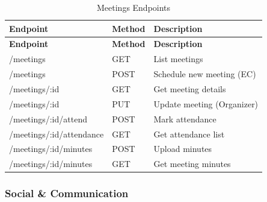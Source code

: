 \documentclass[12pt,a4paper]{article}
\begin{document}
\begin{longtable}{>{\small\ttfamily}p{6.5cm}%
                  >{\small\centering\arraybackslash}p{1.3cm}%
                  >{\small}p{6.7cm}}
\caption{Meetings Endpoints} \\

\rowcolor{Teal}
\color{white}\normalfont\bfseries Endpoint & \color{white}\bfseries Method & \color{white}\bfseries Description \\
\endfirsthead
\rowcolor{Teal}
\color{white}\normalfont\bfseries Endpoint & \color{white}\bfseries Method & \color{white}\bfseries Description \\
\endhead

\midrule
\rowcolor{LightTeal}/meetings & GET & List meetings \\
/meetings & POST & Schedule new meeting (EC) \\
\rowcolor{LightTeal}/meetings/:id & GET & Get meeting details \\
/meetings/:id & PUT & Update meeting (Organizer) \\
\rowcolor{LightTeal}/meetings/:id/attend & POST & Mark attendance \\
/meetings/:id/attendance & GET & Get attendance list \\
\rowcolor{LightTeal}/meetings/:id/minutes & POST & Upload minutes \\
/meetings/:id/minutes & GET & Get meeting minutes \\
\bottomrule
\end{longtable}

\subsubsection{Social \& Communication}
\end{document}
